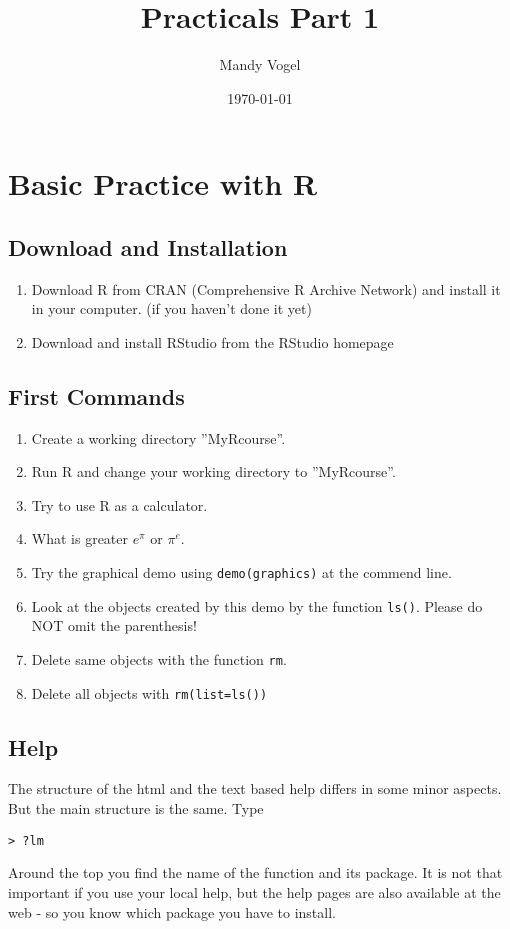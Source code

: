 \documentclass[12pt]{article}
\begin{document}
\title{Practicals Part 1}
\author{Mandy Vogel}
\date{\today}
\maketitle

\section{Basic Practice with R}
\subsection{Download and Installation}
\begin{enumerate}
\item Download R from CRAN (Comprehensive R Archive Network) and install it in your computer. (if you haven't done it yet)
\item Download and install RStudio from the RStudio homepage
\end{enumerate}

\subsection{First Commands}
\begin{enumerate}
\item Create a working directory ''MyRcourse''.
\item Run R and change your working directory to ''MyRcourse''.
\item Try to use R as a calculator.
\item  What is greater $e^{\pi}$ or $\pi^{e}$.
\item Try the graphical demo using \texttt{demo(graphics)} at the commend line.
\item Look at the objects created by this demo by the function \texttt{ls()}. Please do NOT omit the parenthesis!
\item Delete same objects with the function \texttt{rm}.
\item Delete all objects with \texttt{rm(list=ls())}
\end{enumerate}

\subsection{Help}
The structure of the html and the text based help differs in some minor aspects. But the main structure is the same. Type
\begin{verbatim}
> ?lm
\end{verbatim}
Around the top you find the name of the function and its package. It is not that important if you use your local help, but the help pages are also available at the web - so you know which package you have to install.
\end{document}
